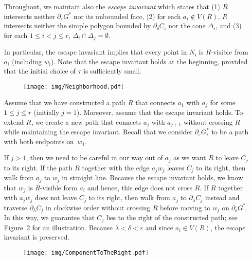 \documentclass[a4paper, 11pt]{article}
\begin{document}
Throughout, we maintain also the \emph{escape invariant} which states that (1) $R$ intersects neither $\partial_\varepsilon G^*$ nor its unbounded face, (2) for each $a_i\notin V(R)$, $R$ intersects neither the simple polygon bounded by $\partial_\delta C_i$ nor the cone $\Delta_i$, and (3) for each $1\leq i< j\leq r$, $\Delta_i\cap \Delta_j = \emptyset$.

In particular, the escape invariant implies that every point in $N_i$ is $R$-visible from $a_i$ (including $w_i$).
Note that the escape invariant holds at the beginning, provided that the initial choice of $\tau$ is sufficiently small.

\begin{figure}[tb]
\centering
\texttt{[image: img/Neighborhood.pdf]}
\caption{\small }
\label{fig:Neighborhood}
\end{figure}

Assume that we have constructed a path $R$ that connects $a_1$ with $a_j$ for some $1\leq j\leq r$ (initially $j = 1$).
Moreover, assume that the escape invariant holds.
To extend $R$, we create a new path that connects $a_j$ with $a_{j+1}$ without crossing $R$ while maintaining the escape invariant. 
Recall that we consider $\partial_\varepsilon G_i^*$ to be a path with both endpoints on~$w_1$.


If $j>1$, then we need to be careful in our way out of $a_j$ as we want $R$ to leave $C_j$ to its right. 
If the path $R$ together with the edge $a_j w_j$ leaves $C_j$ to its right, then walk from $a_j$ to $w_j$ in straight line.
Because the escape invariant holds, we know that $w_j$ is $R$-visible form $a_i$ and hence, this edge does not cross $R$.
If $R$ together with $a_j w_j$ does not leave $C_j$ to its right, then walk from $a_j$ to $\partial_\lambda C_j$ instead and traverse $\partial_\lambda C_j$ in clockwise order without crossing $R$ before moving to $w_j$ on $\partial_\varepsilon G^*$. In this way, we guarantee that $C_j$ lies to the right of the constructed path; see Figure~\ref{fig: Component to the right} for an illustration. 
Because $\lambda < \delta < \varepsilon$ and since $a_i\in V(R)$, the escape invariant is preserved.

\begin{figure}[tb]
\centering
\texttt{[image: img/ComponentToTheRight.pdf]}
\caption{\small }
\label{fig: Component to the right}
\end{figure}
\end{document}
